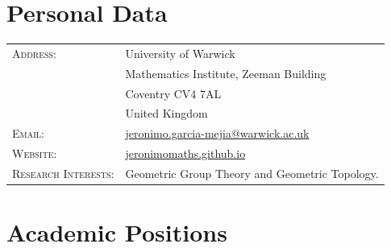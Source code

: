 \documentclass[a4paper,10pt]{article} %
\begin{document}
\pagestyle{empty} %


\par{\bigskip\par} %

\section{Personal Data}

\begin{longtable}{>{\raggedleft\arraybackslash}p{4cm}p{10cm}}
\textsc{Address:} & University of Warwick \\
				  & Mathematics Institute, Zeeman Building\\
				  & Coventry CV4 7AL\\
				  & United Kingdom\\
\textsc{Email:} & \href{mailto:Jeronimo.Garcia-Mejia@warwick.ac.uk}{jeronimo.garcia-mejia@warwick.ac.uk}\\
\textsc{Website:} & \href{https://jeronimomaths.github.io}{jeronimomaths.github.io} \\
\textsc{Research Interests:} & Geometric Group Theory and Geometric Topology. %
\end{longtable}

\section{Academic Positions}

\end{document}
